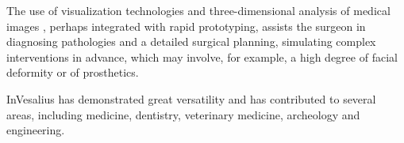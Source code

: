 
The use of visualization technologies and three-dimensional analysis of medical images , perhaps integrated with rapid prototyping, assists the surgeon in diagnosing pathologies and a detailed surgical planning, simulating complex interventions in advance, which may involve, for example, a high degree of facial deformity or of prosthetics.


InVesalius has demonstrated great versatility and has contributed to several areas,
including medicine, dentistry, veterinary medicine, archeology and engineering.
		
\noindent
